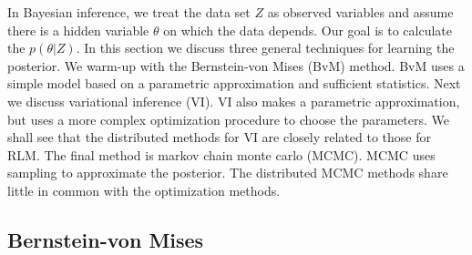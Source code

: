 \documentclass[thesis.tex]{subfiles}
\begin{document}
In Bayesian inference, 
we treat the data set $Z$ as observed variables and assume there is a hidden variable $\theta$ on which the data depends.
Our goal is to calculate the  $p(\theta | Z)$.
In this section we discuss three general techniques for learning the posterior.
We warm-up with the Bernstein-von Mises (BvM) method.
BvM uses a simple model based on a parametric approximation and sufficient statistics.
Next we discuss variational inference (VI).
VI also makes a parametric approximation,
but uses a more complex optimization procedure to choose the parameters.
We shall see that the distributed methods for VI are closely related to those for RLM.
The final method is markov chain monte carlo (MCMC).
MCMC uses sampling to approximate the posterior.
The distributed MCMC methods share little in common with the optimization methods.



\subsection{Bernstein-von Mises}
\end{document}
